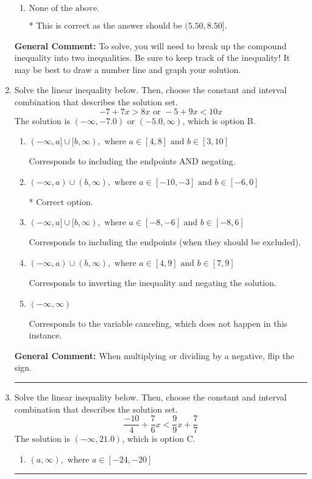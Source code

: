 \documentclass{extbook}[14pt]
\newcommand{\litem}[1]{\item #1

\rule{\textwidth}{0.4pt}}
\begin{document}
\begin{enumerate}
{\begin{enumerate}[label=\Alph*.]
$(-\infty, -5.50) \cup [-8.50, \infty)$, which corresponds to displaying the and-inequality as an or-inequality and getting negatives of the actual endpoints.
\item \( \text{None of the above.} \)

* This is correct as the answer should be $(5.50, 8.50]$.
\end{enumerate}

\textbf{General Comment:} To solve, you will need to break up the compound inequality into two inequalities. Be sure to keep track of the inequality! It may be best to draw a number line and graph your solution.
}
\litem{
Solve the linear inequality below. Then, choose the constant and interval combination that describes the solution set.
\[ -7 + 7 x > 8 x \text{ or } -5 + 9 x < 10 x \]The solution is \( (-\infty, -7.0) \text{ or } (-5.0, \infty) \), which is option B.\begin{enumerate}[label=\Alph*.]
\item \( (-\infty, a] \cup [b, \infty), \text{ where } a \in [4, 8] \text{ and } b \in [3, 10] \)

Corresponds to including the endpoints AND negating.
\item \( (-\infty, a) \cup (b, \infty), \text{ where } a \in [-10, -3] \text{ and } b \in [-6, 0] \)

 * Correct option.
\item \( (-\infty, a] \cup [b, \infty), \text{ where } a \in [-8, -6] \text{ and } b \in [-8, 6] \)

Corresponds to including the endpoints (when they should be excluded).
\item \( (-\infty, a) \cup (b, \infty), \text{ where } a \in [4, 9] \text{ and } b \in [7, 9] \)

Corresponds to inverting the inequality and negating the solution.
\item \( (-\infty, \infty) \)

Corresponds to the variable canceling, which does not happen in this instance.
\end{enumerate}

\textbf{General Comment:} When multiplying or dividing by a negative, flip the sign.
}
\litem{
Solve the linear inequality below. Then, choose the constant and interval combination that describes the solution set.
\[ \frac{-10}{4} + \frac{7}{6} x < \frac{9}{9} x + \frac{7}{7} \]The solution is \( (-\infty, 21.0) \), which is option C.\begin{enumerate}[label=\Alph*.]
\item \( (a, \infty), \text{ where } a \in [-24, -20] \)


\end{enumerate}}
\end{enumerate}
\end{document}
